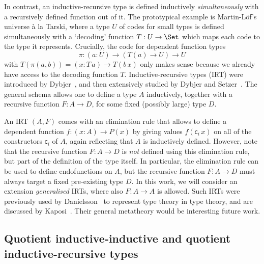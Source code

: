 \documentclass[a4paper,UKenglish,numberwithinsect,cleveref,thm-restate]{lipics-v2021}
\newcommand{\LT}[2][]{\todo[inline,author={L-T},caption={},color={pink},#1]{#2}}
\begin{document}
In contrast, an inductive-recursive type is defined inductively \emph{simultaneously} with a recursively defined function out of it. The prototypical example is Martin-L\"of's universe \`a la Tarski, where a type $U$ of codes for small types is defined simultaneously with a `decoding' function $T : U \to \Set$ which maps each code to the type it represents. Crucially, the code for dependent function types
\[
  \pi : (a : U) \to (T(a) \to U) \to U
\]
with $T(\pi(a, b)) = (x : T\,a) \to T(b\, x)$ only makes sense because we already have access to the decoding function $T$.
%
Inductive-recursive types (IRT) were introduced by Dybjer~\cite{Dybjer2000}, and then extensively studied by Dybjer and Setzer~\cite{Dybjer1999,Dybjer2003}.
The general schema allows one to define a type $A$ inductively, together with a recursive function $F : A \to D$, for some fixed (possibly large) type $D$.

An IRT $(A, F)$ comes with an elimination rule that allows to define a dependent function  $f : (x : A) \to P(x)$ by giving values $f(\mathsf{c}_i\,x)$ on all of the constructors $\mathsf{c}_i$ of $A$, again reflecting that $A$ is inductively defined.
%
However, note that the recursive function $F : A \to D$ is \emph{not} defined using this elimination rule, but part of the definition of the type itself.
%
In particular, the elimination rule can be used to define endofunctions on $A$, but the recursive function  $F : A \to D$ must always target a fixed pre-existing type $D$.
%
In this work, we will consider an extension \emph{generalised} IRTs, where also $F : A \to A$ is allowed.
%
Such IRTs were previously used by Danielsson~\cite{Danielsson2006} to represent type theory in type theory, and are discussed by Kaposi~\cite{Kaposi2023}.
%
Their general metatheory would be interesting future work.



\subsection{Quotient inductive-inductive and quotient inductive-recursive types}
\end{document}
